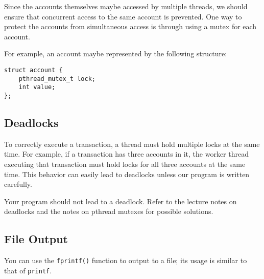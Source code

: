 \documentclass[letterpaper,10pt]{article}
\begin{document}
Since the accounts themselves maybe accessed by multiple threads, we should ensure that concurrent
access to the same account is prevented. One way to protect the accounts from simultaneous access is
through using a mutex for each account.

For example, an account maybe represented by the following structure:
\begin{verbatim}
struct account {
    pthread_mutex_t lock;
    int value;
};
\end{verbatim}


\subsection{Deadlocks}

To correctly execute a transaction, a thread must hold multiple locks at the same time. For example, if a
transaction has three accounts in it, the worker thread executing that transaction must hold locks for all
three accounts at the same time. This behavior can easily lead to deadlocks unless our program is written
carefully.

Your program should not lead to a deadlock.
Refer to the lecture notes on deadlocks and the notes on pthread mutexes for possible solutions.


\subsection{File Output}
%

You can use the \verb+fprintf()+ function to output to a file; its usage is similar to that of \verb+printf+.
\end{document}
